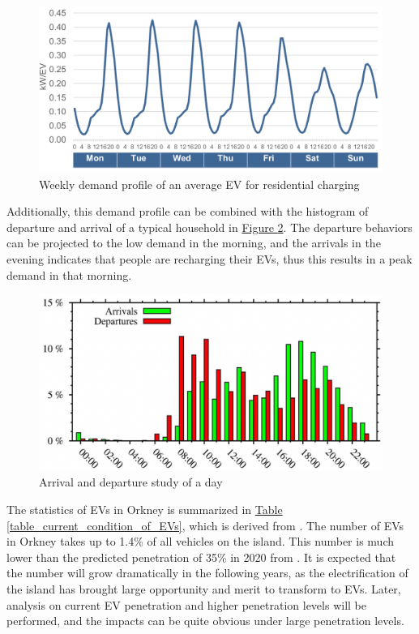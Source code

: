 \documentclass[12pt,a4paper]{report}
\begin{document}
        \begin{figure}[htbp]
            \centerline{\includegraphics[scale=1]{EVchargingdistribution}}
            \caption{Weekly demand profile of an average EV for residential charging}
            \label{fig_weekly_demand_profile}
        \end{figure}

        Additionally, this demand profile can be combined with the histogram of departure and arrival of a typical household in \hyperref[fig_arrival_vs_departure]{Figure \ref*{fig_arrival_vs_departure}}. The departure behaviors can be projected to the low demand in the morning, and the arrivals in the evening indicates that people are recharging their EVs, thus this results in a peak demand in that morning.

        \begin{figure}[htbp]
            \centerline{\includegraphics[scale=1.9]{evdepartures}}
            \caption{Arrival and departure study of a day}
            \label{fig_arrival_vs_departure}
        \end{figure}

        The statistics of EVs in Orkney is summarized in \hyperref[table_current_condition_of_EVs]{Table \ref*{table_current_condition_of_EVs}}, which is derived from \cite{report:OrkneyAudit}. The number of EVs in Orkney takes up to 1.4\% of all vehicles on the island. This number is much lower than the predicted penetration of 35\% in 2020 from \cite{paper:PieltainFernandez2011}. It is expected that the number will grow dramatically in the following years, as the electrification of the island has brought large opportunity and merit to transform to EVs. Later, analysis on current EV penetration and higher penetration levels will be performed, and the impacts can be quite obvious under large penetration levels.
\end{document}
